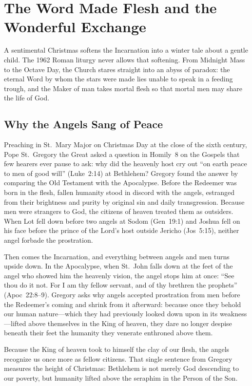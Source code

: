 \section{The Word Made Flesh and the Wonderful Exchange}\label{sec:theology}

A sentimental Christmas softens the Incarnation into a winter tale about a
gentle child. The 1962 Roman liturgy never allows that softening. From Midnight
Mass to the Octave Day, the Church stares straight into an abyss of paradox: the
eternal Word by whom the stars were made lies unable to speak in a feeding
trough, and the Maker of man takes mortal flesh so that mortal men may share the
life of God.

\subsection{Why the Angels Sang of Peace}

Preaching in St.~Mary Major on Christmas Day at the close of the sixth century,
Pope St.~Gregory the Great asked a question in Homily~8 on the Gospels that few
hearers ever pause to ask: why did the heavenly host cry out ``on earth peace to
men of good will'' (Luke~2:14) at Bethlehem? Gregory found the answer by
comparing the Old Testament with the Apocalypse. Before the Redeemer was born in
the flesh, fallen humanity stood in discord with the angels, estranged from
their brightness and purity by original sin and daily transgression. Because
men were strangers to God, the citizens of heaven treated them as outsiders.
When Lot fell down before two angels at Sodom (Gen~19:1) and Joshua fell on his
face before the prince of the Lord's host outside Jericho (Jos~5:15), neither
angel forbade the prostration.

Then comes the Incarnation, and everything between angels and men turns upside
down. In the Apocalypse, when St.~John falls down at the feet of the angel who
showed him the heavenly vision, the angel stops him at once: ``See thou do it
not. For I am thy fellow servant, and of thy brethren the prophets''
(Apoc~22:8--9). Gregory asks why angels accepted prostration from men before the Redeemer's
coming and shrink from it afterward: because once they behold our human
nature---which they had previously looked down upon in its weakness---lifted
above themselves in the King of heaven, they dare no longer despise beneath
their feet the humanity they venerate enthroned above them.

Because the King of heaven took to himself the clay of our flesh, the angels
recognize us once more as fellow citizens. That single sentence from Gregory
measures the height of Christmas: Bethlehem is not merely God descending to our
poverty, but humanity lifted above the seraphim in the Person of the Son.

